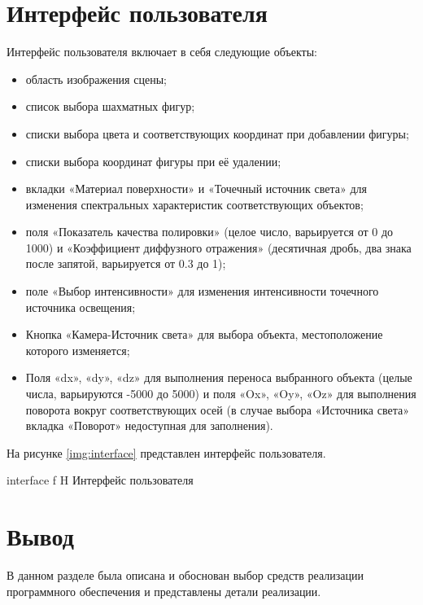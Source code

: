 \section{Интерфейс пользователя}

Интерфейс пользователя включает в себя следующие объекты:

\begin{itemize}
	\item область изображения сцены;
	\item список выбора шахматных фигур;
	\item списки выбора цвета и соответствующих координат при добавлении фигуры;
	\item списки выбора координат фигуры при её удалении;
	\item вкладки «Материал поверхности» и «Точечный источник света» для изменения спектральных характеристик соответствующих объектов;
	\item поля «Показатель качества полировки» (целое число, варьируется от 0 до 1000) и «Коэффициент диффузного отражения» (десятичная дробь, два знака после запятой, варьируется от 0.3 до 1);
	\item поле «Выбор интенсивности» для изменения интенсивности точечного источника освещения;
	\item Кнопка «Камера-Источник света» для выбора объекта, местоположение которого изменяется;
	\item Поля «dx», «dy», «dz» для выполнения переноса выбранного объекта (целые числа, варьируются -5000 до 5000) и поля «Ox», «Oy», «Oz» для выполнения поворота вокруг соответствующих осей (в случае выбора «Источника света» вкладка «Поворот» недоступная для заполнения).
\end{itemize}

На рисунке \ref{img:interface} представлен интерфейс пользователя. 

{interface}
{f}
{H}
{\textwidth}
{Интерфейс пользователя}

\section*{Вывод}

В данном разделе была описана и обоснован выбор средств реализации программного обеспечения и представлены детали реализации.

